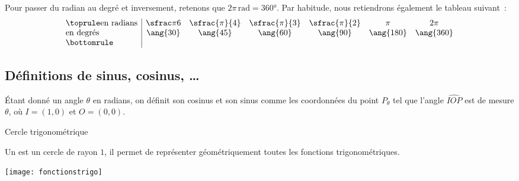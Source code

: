 \documentclass[french,xcolor=svgnames]{beamer}
\begin{document}
\begin{frame}
  Pour passer du radian au degré et inversement, retenons que $2\pi\,\si{\radian} = \ang{360}$.\pause{} Par habitude, nous retiendrons également le tableau suivant~:\pause{}
  \begin{equation*}
    \begin{array}{l|cccccc}\toprule
      \text{en radians} & \sfrac \pi 6 & \sfrac{\pi}{4} & \sfrac{\pi}{3} & \sfrac{\pi}{2}& \pi & 2 \pi\\
      \text{en degrés} & \ang{30} & \ang{45} & \ang{60} & \ang{90} & \ang{180} & \ang{360}\\\bottomrule
    \end{array}
  \end{equation*}
\end{frame}

\subsection{Définitions de sinus, cosinus, \dots}
\label{sec:cercletrigono}\label{sec:fonctiontrigono}

\begin{frame}
  \begin{definition}
    Étant donné un angle \(\theta\) en radians,\pause{} on définit son cosinus et son sinus\pause{} comme les coordonnées du point \(P_{\theta}\)\pause{} tel que l'angle \(\widehat{IOP}\)\pause{} est de mesure \(\theta\)\pause{}, où \(I = (1,0)\) et \(O = (0,0)\).
  \end{definition}\pause


\end{frame}

\begin{frame}{Cercle trigonométrique}
  \begin{definition}
    Un  est un cercle de rayon $1$,\pause{} il permet de représenter géométriquement toutes les fonctions trigonométriques.\pause{}
  \end{definition}

  \begin{center}
    \texttt{[image: fonctionstrigo]}
  \end{center}
\end{frame}
\end{document}
